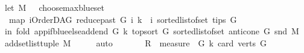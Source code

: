 \begin{isabellebody}
\ let\ M\ {\isacharequal}{\kern0pt}\ \ choose{\isacharunderscore}{\kern0pt}max{\isacharunderscore}{\kern0pt}blue{\isacharunderscore}{\kern0pt}set\ \isanewline
\ \ {\isacharparenleft}{\kern0pt}{\isacharparenleft}{\kern0pt}map\ {\isacharparenleft}{\kern0pt}{\isasymlambda}i{\isachardot}{\kern0pt}{\isacharparenleft}{\kern0pt}{\isacharparenleft}{\kern0pt}{\isacharparenleft}{\kern0pt}OrderDAG\ {\isacharparenleft}{\kern0pt}reduce{\isacharunderscore}{\kern0pt}past\ G\ i{\isacharparenright}{\kern0pt}\ k{\isacharparenright}{\kern0pt}{\isacharparenright}{\kern0pt}\ {\isacharcomma}{\kern0pt}\ i{\isacharparenright}{\kern0pt}{\isacharparenright}{\kern0pt}\ {\isacharparenleft}{\kern0pt}sorted{\isacharunderscore}{\kern0pt}list{\isacharunderscore}{\kern0pt}of{\isacharunderscore}{\kern0pt}set\ {\isacharparenleft}{\kern0pt}tips\ G{\isacharparenright}{\kern0pt}{\isacharparenright}{\kern0pt}{\isacharparenright}{\kern0pt}{\isacharparenright}{\kern0pt}\isanewline
\ in\ fold\ {\isacharparenleft}{\kern0pt}app{\isacharunderscore}{\kern0pt}if{\isacharunderscore}{\kern0pt}blue{\isacharunderscore}{\kern0pt}else{\isacharunderscore}{\kern0pt}add{\isacharunderscore}{\kern0pt}end\ G\ k{\isacharparenright}{\kern0pt}\ {\isacharparenleft}{\kern0pt}top{\isacharunderscore}{\kern0pt}sort\ G\ {\isacharparenleft}{\kern0pt}sorted{\isacharunderscore}{\kern0pt}list{\isacharunderscore}{\kern0pt}of{\isacharunderscore}{\kern0pt}set\ {\isacharparenleft}{\kern0pt}anticone\ G\ {\isacharparenleft}{\kern0pt}snd\ M{\isacharparenright}{\kern0pt}{\isacharparenright}{\kern0pt}{\isacharparenright}{\kern0pt}{\isacharparenright}{\kern0pt}\isanewline
\ {\isacharparenleft}{\kern0pt}add{\isacharunderscore}{\kern0pt}set{\isacharunderscore}{\kern0pt}list{\isacharunderscore}{\kern0pt}tuple\ M{\isacharparenright}{\kern0pt}{\isacharparenright}{\kern0pt}\isanewline
\ {\isachardoublequoteclose}\isanewline
%
\isadelimproof
\ \ %
\endisadelimproof
%
\isatagproof
{}\isamarkupfalse%
\ auto%
\endisatagproof
{\isafoldproof}%
%
\isadelimproof
\isanewline
%
\endisadelimproof
{}\isamarkupfalse%
%
\isadelimproof
\ %
\endisadelimproof
%
\isatagproof
{}\isamarkupfalse%
\ \isanewline
\ \ \isamarkupfalse%
\ {\isacharquery}{\kern0pt}R\ {\isacharequal}{\kern0pt}\ {\isachardoublequoteopen}measure\ {\isacharparenleft}{\kern0pt}\ {\isasymlambda}{\isacharparenleft}{\kern0pt}G{\isacharcomma}{\kern0pt}\ k{\isacharparenright}{\kern0pt}{\isachardot}{\kern0pt}\ {\isacharparenleft}{\kern0pt}card\ {\isacharparenleft}{\kern0pt}verts\ G{\isacharparenright}{\kern0pt}{\isacharparenright}{\kern0pt}{\isacharparenright}{\kern0pt}{\isachardoublequoteclose}\isanewline

\end{isabellebody}
